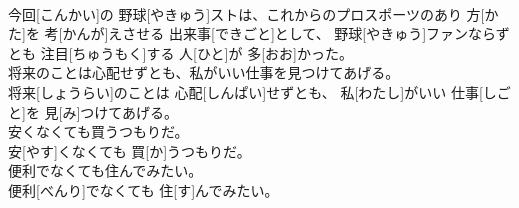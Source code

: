 \documentclass[8pt]{extreport}
\begin{document}
\begin{CJK}{UTF8}{min}
\\	今回[こんかい]の 野球[やきゅう]ストは、これからのプロスポーツのあり 方[かた]を 考[かんが]えさせる 出来事[できごと]として、 野球[やきゅう]ファンならずとも 注目[ちゅうもく]する 人[ひと]が 多[おお]かった。
\\	将来のことは心配せずとも、私がいい仕事を見つけてあげる。	
\\	将来[しょうらい]のことは 心配[しんぱい]せずとも、 私[わたし]がいい 仕事[しごと]を 見[み]つけてあげる。
\\	安くなくても買うつもりだ。	
\\	安[やす]くなくても 買[か]うつもりだ。
\\	便利でなくても住んでみたい。	
\\	便利[べんり]でなくても 住[す]んでみたい。
\end{CJK}
\end{document}
